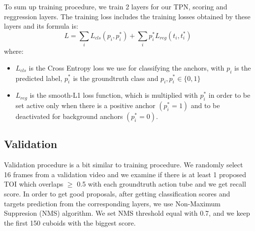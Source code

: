 To sum up training procedure, we train 2 layers for our TPN, scoring and reggression layers. The training loss includes the training losses
obtained by these layers and its formula is:
\[ L  =  \sum_iL_{cls}(p_i, p_i^*) + \sum_ip_i^*L_{reg}(t_i,t_i^*) \]
where:
\begin{itemize}
\item $L_{cls} $ is the Cross Entropy loss we use for classifying the anchors, with $p_i$ is the predicted label, $p_i^*$ is the groundtruth class and
  $p_i, p_i^* \in \{0,1\}$
\item $L_{reg} $ is the smooth-L1 loss function, which is multiplied  with $p_i^*$ in order to be set active only when there is a positive anchor $(p_i^* = 1)$
  and to be deactivated for background anchors $(p_i^* = 0)$.
\end{itemize}

\subsection{Validation}

Validation procedure is a bit similar to training procedure.
We randomly select 16 frames from a validation video and we examine if there is at least 1 proposed TOI
which overlaps $\ge$ 0.5 with each groundtruth action tube and we get recall score. 
In order to get good proposals, after getting classification scores and targets prediction from the
corresponding layers, we use Non-Maximum Suppresion (NMS) algorithm.  We set NMS threshold equal with 0.7,
and we keep the first 150 cuboids with the biggest score.

